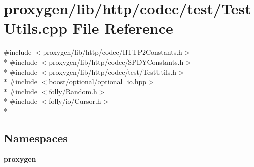 \section{proxygen/lib/http/codec/test/\+Test\+Utils.cpp File Reference}
\label{codec_2test_2TestUtils_8cpp}
{\ttfamily \#include $<$proxygen/lib/http/codec/\+H\+T\+T\+P2\+Constants.\+h$>$}\\*
{\ttfamily \#include $<$proxygen/lib/http/codec/\+S\+P\+D\+Y\+Constants.\+h$>$}\\*
{\ttfamily \#include $<$proxygen/lib/http/codec/test/\+Test\+Utils.\+h$>$}\\*
{\ttfamily \#include $<$boost/optional/optional\+\_\+io.\+hpp$>$}\\*
{\ttfamily \#include $<$folly/\+Random.\+h$>$}\\*
{\ttfamily \#include $<$folly/io/\+Cursor.\+h$>$}\\*
\subsection*{Namespaces}
\begin{DoxyCompactItemize}
\item 
 {\bf proxygen}
\end{DoxyCompactItemize}
